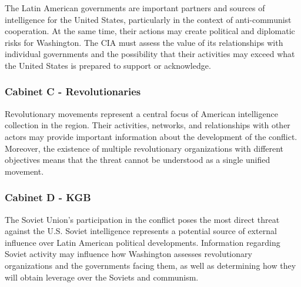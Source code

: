 The Latin American governments are important partners and sources of intelligence for the United States, particularly in the context of anti-communist cooperation. At the same time, their actions may create political and diplomatic risks for Washington. The CIA must assess the value of its relationships with individual governments and the possibility that their activities may exceed what the United States is prepared to support or acknowledge.

\subsubsection{Cabinet C - Revolutionaries}

Revolutionary movements represent a central focus of American intelligence collection in the region. Their activities, networks, and relationships with other actors may provide important information about the development of the conflict. Moreover, the existence of multiple revolutionary organizations with different objectives means that the threat cannot be understood as a single unified movement.

\subsubsection{Cabinet D - KGB}

The Soviet Union’s participation in the conflict poses the most direct threat against the U.S. Soviet intelligence represents a potential source of external influence over Latin American political developments. Information regarding Soviet activity may influence how Washington assesses revolutionary organizations and the governments facing them, as well as determining how they will obtain leverage over the Soviets and communism.
